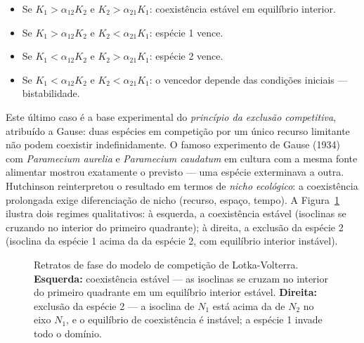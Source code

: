 \begin{itemize}
\item Se $K_1 > \alpha_{12} K_2$ e $K_2 > \alpha_{21} K_1$: coexistência
  estável em equilíbrio interior.
\item Se $K_1 > \alpha_{12} K_2$ e $K_2 < \alpha_{21} K_1$: espécie 1 vence.
\item Se $K_1 < \alpha_{12} K_2$ e $K_2 > \alpha_{21} K_1$: espécie 2 vence.
\item Se $K_1 < \alpha_{12} K_2$ e $K_2 < \alpha_{21} K_1$: o vencedor
  depende das condições iniciais --- bistabilidade.
\end{itemize}

Este último caso é a base experimental do \emph{princípio da exclusão
competitiva}, atribuído a Gause: duas espécies em competição por um único
recurso limitante não podem coexistir indefinidamente. O famoso experimento
de Gause (1934) com \textit{Paramecium aurelia} e \textit{Paramecium caudatum}
em cultura com a mesma fonte alimentar mostrou exatamente o previsto --- uma
espécie exterminava a outra. Hutchinson reinterpretou o resultado em termos de
\emph{nicho ecológico}: a coexistência prolongada exige diferenciação de nicho
(recurso, espaço, tempo). A Figura~\ref{fig:10-competicao} ilustra dois
regimes qualitativos: à esquerda, a coexistência estável (isoclinas se
cruzando no interior do primeiro quadrante); à direita, a exclusão da
espécie 2 (isoclina da espécie 1 acima da da espécie 2, com equilíbrio
interior instável).

\begin{figure}[htbp]
\centering
{}
\caption{Retratos de fase do modelo de competição de Lotka-Volterra. \textbf{Esquerda:} coexistência estável --- as isoclinas se cruzam no interior do primeiro quadrante em um equilíbrio interior estável. \textbf{Direita:} exclusão da espécie 2 --- a isoclina de $N_1$ está acima da de $N_2$ no eixo $N_1$, e o equilíbrio de coexistência é instável; a espécie 1 invade todo o domínio.}
\label{fig:10-competicao}
\end{figure}

